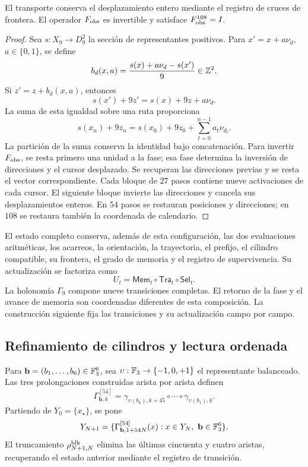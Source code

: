 \begin{proposition}
\label{hmtfg:transporte-calendario}
El transporte conserva el desplazamiento entero mediante el registro de
cruces de frontera. El operador \(F_{\rm obs}\) es invertible y satisface
\(F_{\rm obs}^{108}=I\).
\end{proposition}
\begin{proof}
Sea \(s:X_9\to D_9^2\) la sección de representantes positivos. Para
\(x'=x+a\nu_d\), \(a\in\{0,1\}\), se define
\[
 b_d(x,a)=\frac{s(x)+a\nu_d-s(x')}{9}\in\mathbb Z^2.
\]
Si \(z'=z+b_d(x,a)\), entonces
\[
 s(x')+9z'=s(x)+9z+a\nu_d.
\]
La suma de esta igualdad sobre una ruta proporciona
\[
 s(x_n)+9z_n=s(x_0)+9z_0+\sum_{t=0}^{n-1}a_t\nu_{d_t}.
\]
La partición de la suma conserva la identidad bajo concatenación.
Para invertir \(F_{\rm obs}\), se resta primero una unidad a la fase;
esa fase determina la inversión de direcciones y el cursor desplazado.
Se recuperan las direcciones previas y se resta el vector correspondiente.
Cada bloque de \(27\) pasos contiene nueve activaciones de cada cursor.
El siguiente bloque invierte las direcciones y cancela sus desplazamientos
enteros. En \(54\) pasos se restauran posiciones y direcciones; en
\(108\) se restaura también la coordenada de calendario.
\end{proof}

El estado completo conserva, además de esta configuración, las dos
evaluaciones aritméticas, los acarreos, la orientación, la trayectoria,
el prefijo, el cilindro compatible, su frontera, el grado de memoria y el
registro de supervivencia. Su actualización se factoriza como
\[
 U_t=\mathsf{Mem}_t\circ\mathsf{Tra}_t\circ\mathsf{Sel}_t.
\]
La holonomía \(\Gamma_9\) compone nueve transiciones completas. El retorno
de la fase y el avance de memoria son coordenadas diferentes de esta
composición. La construcción siguiente fija las transiciones y su
actualización campo por campo.



\subsection{Refinamiento de cilindros y lectura ordenada}
\label{hmtfg:refinamiento-ordenado}

Para \(\mathbf b=(b_1,\ldots,b_6)\in\mathbb F_3^6\), sea
\(\upsilon:\mathbb F_3\to\{-1,0,+1\}\) el representante balanceado.
Las tres prolongaciones construidas arista por arista definen
\[
 \Gamma^{[54]}_{\mathbf b,k}
 =\gamma_{\upsilon(b_6),k+45}\circ\cdots\circ
   \gamma_{\upsilon(b_1),k}.
\]
Partiendo de \(Y_0=\{x_\star\}\), se pone
\[
 Y_{N+1}
 =\{\Gamma^{[54]}_{\mathbf b,1+54N}(x):
          x\in Y_N,\ \mathbf b\in\mathbb F_3^6\}.
\]
El truncamiento \(\rho^{\rm blk}_{N+1,N}\) elimina las últimas
cincuenta y cuatro aristas, recuperando el estado anterior mediante
el registro de transición.

